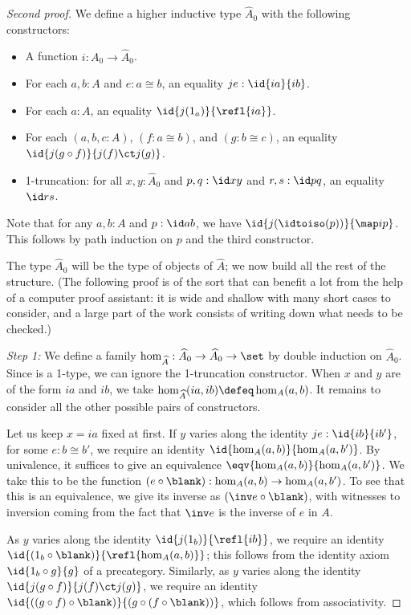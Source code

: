 \begin{proof}[Second proof]
  We define a higher inductive type $\widehat A_0$ with the following constructors:
  \begin{itemize}
  \item A function $i:A_0 \to \widehat A_0$.
  \item For each $a,b:A$ and $e:a\cong b$, an equality $je:\id{ia}{ib}$.
  \item For each $a:A$, an equality $\id{j(1_a)}{\refl{ia}}$.
  \item For each $(a,b,c:A)$, $(f:a\cong b)$, and $(g:b\cong c)$, an equality $\id{j(g \circ f)}{j(f)\ct j(g)}$.
  \item 1-truncation: for all $x,y:\widehat A_0$ and $p,q:\id x y$ and $r,s:\id p q$, an equality $\id r s$.
  \end{itemize}
  Note that for any $a,b:A$ and $p:\id a b$, we have $\id{j(\idtoiso(p))}{\map i p}$.
  This follows by path induction on $p$ and the third constructor.

  The type $\widehat A_0$ will be the type of objects of $\widehat A$; we now build all the rest of the structure.
  (The following proof is of the sort that can benefit a lot from the help of a computer proof assistant: it is wide and shallow with many short cases to consider, and a large part of the work consists of writing down what needs to be checked.)

  \mentalpause

  \emph{Step 1:} We define a family $\hom_{\widehat A}:\widehat A_0\to \widehat A_0 \to \set$ by double induction on $\widehat A_0$.
  Since \set is a 1-type, we can ignore the 1-truncation constructor.
  When $x$ and $y$ are of the form $ia$ and $ib$, we take $\hom_{\widehat A}(ia,ib) \defeq \hom_A(a,b)$.
  It remains to consider all the other possible pairs of constructors.

  Let us keep $x=ia$ fixed at first.
  If $y$ varies along the identity $je:\id{ib}{ib'}$, for some $e:b\cong b'$, we require an identity $\id{\hom_A(a,b)}{\hom_A(a,b')}$.
  By univalence, it suffices to give an equivalence $\eqv{\hom_A(a,b)}{\hom_A(a,b')}$.
  We take this to be the function $(e\circ \blank ):\hom_A(a,b)\to \hom_A(a,b')$.
  To see that this is an equivalence, we give its inverse as $(\inv e\circ \blank )$, with witnesses to inversion coming from the fact that $\inv e$ is the inverse of $e$ in $A$.

  As $y$ varies along the identity $\id{j(1_b)}{\refl{ib}}$, we require an identity $\id{(1_b\circ \blank )}{\refl{\hom_A(a,b)}}$; this follows from the identity axiom $\id{1_b\circ g}{g}$ of a precategory.
  Similarly, as $y$ varies along the identity $\id{j(g\circ f)}{j(f)\ct j(g)}$, we require an identity $\id{((g\circ f)\circ \blank )}{(g\circ (f\circ \blank ))}$, which follows from associativity.


\end{proof}
